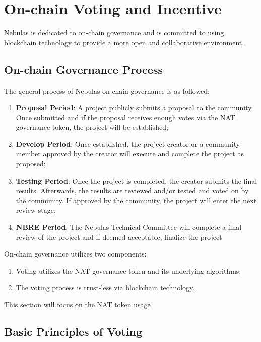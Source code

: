 \section{On-chain Voting and Incentive}

Nebulas is dedicated to on-chain governance and is committed to using blockchain technology to provide a more open and collaborative environment.

\subsection{On-chain Governance Process}
\label{governance}

The general process of Nebulas on-chain governance is as followed:

\begin{enumerate}
	\item \textbf{Proposal Period}: A project publicly submits a proposal to the community. Once submitted and if the proposal receives enough votes via the NAT governance token, the project will be established; 
	\item \textbf{Develop Period}: Once established, the project creator or a community member approved by the creator will execute and complete the project as proposed;
	\item \textbf{Testing Period}: Once the project is completed, the creator submits the final results. Afterwards, the results are reviewed and/or tested and voted on by the community. If approved by the community, the project will enter the next review stage;
	\item \textbf{NBRE Period}: The Nebulas Technical Committee will complete a final review of the project and if deemed acceptable, finalize the project
\end{enumerate}

On-chain governance utilizes two components:

\begin{enumerate}
	\item Voting utilizes the NAT governance token and its underlying algorithms;
	\item The voting process is trust-less via blockchain technology.
\end{enumerate}

This section will focus on the NAT token usage

\subsection{Basic Principles of Voting}

